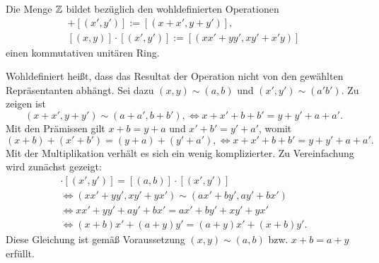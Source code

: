 \begin{Satz}
Die Menge $\mathbb Z$ bildet bezüglich den wohldefinierten Operationen
\begin{gather*}
[(x,y)] + [(x',y')] := [(x+x',y+y')],\\
[(x,y)]\cdot [(x',y')] := [(xx'+yy',xy'+x'y)]
\end{gather*}
einen kommutativen unitären Ring.
\end{Satz}
\begin{Beweis}
Wohldefiniert heißt, dass das Resultat der Operation nicht von den
gewählten Repräsentanten abhängt. Sei dazu $(x,y)\sim (a,b)$ und
$(x',y')\sim (a'b')$. Zu zeigen ist%
\[(x+x',y+y') \sim (a+a',b+b'), \iff x+x'+b+b' = y+y'+a+a'.\]
Mit den Prämissen gilt $x+b=y+a$ und $x'+b'=y'+a'$, womit
\[(x+b)+(x'+b') = (y+a)+(y'+a'), \iff x+x'+b+b' = y+y'+a+a'.\]
Mit der Multiplikation verhält es sich ein wenig komplizierter.
Zu Vereinfachung wird zunächst gezeigt:
\begin{gather*}
[(x,y)]\cdot [(x',y')] = [(a,b)]\cdot [(x',y')]\\
\iff (xx'+yy',xy'+yx')\sim (ax'+by',ay'+bx')\\
\iff xx'+yy' + ay'+bx' = ax'+by' + xy'+yx'\\
\iff (x+b)x' + (a+y)y' = (a+y)x' + (x+b)y'.
\end{gather*}
Diese Gleichung ist gemäß Voraussetzung $(x,y)\sim (a,b)$
bzw. $x+b=a+y$ erfüllt.


\end{Beweis}
